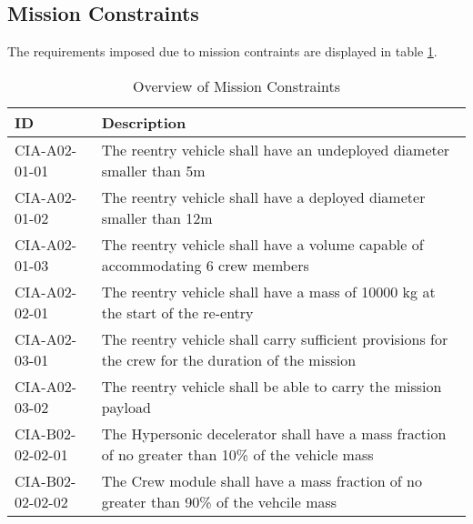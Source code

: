 \subsection{Mission Constraints} \label{sec:MisCon}
The requirements  imposed due to mission contraints are displayed in table \ref{tab:MissionCon}.
\begin{table}[H]
	\caption{Overview of Mission Constraints}
	\begin{tabular}{|p{}|p{}|}
    \hline
    ID          & Description                                                                                                      \\ \hline \hline
		CIA-A02-01-01 & The reentry vehicle shall have an undeployed diameter smaller than 5m                         				            \\ \hline
		CIA-A02-01-02 & The reentry vehicle shall have a deployed diameter smaller than 12m                         				            \\ \hline
		CIA-A02-01-03 & The reentry vehicle shall have a volume capable of accommodating 6 crew members                        				            \\ \hline
		CIA-A02-02-01 & The reentry vehicle shall have a mass of 10000 kg at the start of the re-entry                       				            \\ \hline
		CIA-A02-03-01 & The reentry vehicle shall carry sufficient provisions for the crew for the duration of the mission \\ \hline
		CIA-A02-03-02 & The reentry vehicle shall be able to carry the mission payload								\\ \hline
		CIA-B02-02-02-01 & The Hypersonic decelerator shall have a mass fraction of no greater than 10\% of the vehicle mass  \\ \hline
		CIA-B02-02-02-02 & The Crew module shall have a mass fraction of no greater than 90\% of the vehcile mass \\ \hline
	
		\end{tabular}
    \label{tab:MissionCon}
\end{table}